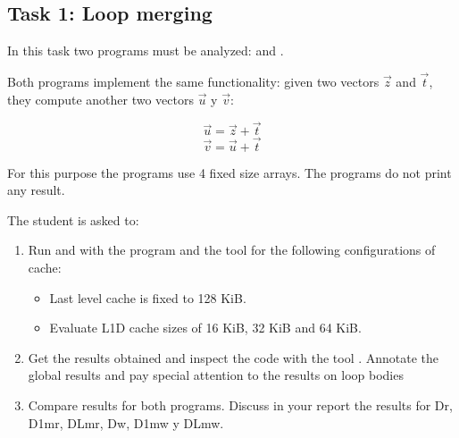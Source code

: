 \clearpage
\subsection{Task 1: Loop merging}

In this task two programs must be analyzed:  and
.





Both programs implement the same functionality: given two vectors $\vec{z}$ and
$\vec{t}$, they compute another two vectors $\vec{u}$ y $\vec{v}$:

\[
\vec{u} = \vec{z} + \vec{t}
\]
\[
\vec{v} = \vec{u} + \vec{t}
\]

For this purpose the programs use 4 fixed size arrays.  
The programs do not print any result.

The student is asked to: 

\begin{enumerate}

\item Run  and 
with the program  and
the tool  for the following configurations of cache:

\begin{itemize}
\item Last level cache is fixed to 128 KiB.
\item Evaluate L1D cache sizes of 16 KiB, 32 KiB and 64 KiB.
\end{itemize}

\item Get the results obtained and inspect the code with the tool
. Annotate the global results and pay special
attention to the results on loop bodies


\item Compare results for both programs. Discuss in your report the results for
Dr, D1mr, DLmr, Dw, D1mw y DLmw. 
\end{enumerate}
